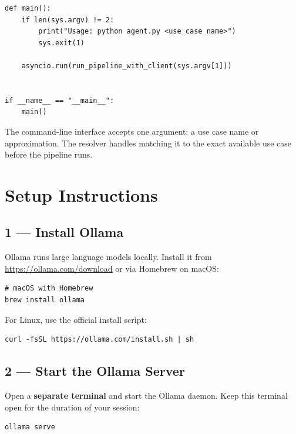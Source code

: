 \documentclass[12pt, a4paper]{article}
\begin{document}
\begin{lstlisting}[style=pythonstyle]
def main():
    if len(sys.argv) != 2:
        print("Usage: python agent.py <use_case_name>")
        sys.exit(1)

    asyncio.run(run_pipeline_with_client(sys.argv[1]))


if __name__ == "__main__":
    main()
\end{lstlisting}

The command-line interface accepts one argument: a use case name or approximation. The resolver handles matching it to the exact available use case before the pipeline runs.


\clearpage
\section{Setup Instructions}
\label{appendix:quickstart}
\subsection{1 --- Install Ollama}

Ollama runs large language models locally. Install it from \url{https://ollama.com/download} or via Homebrew on macOS:

\begin{lstlisting}[style=shellstyle]
# macOS with Homebrew
brew install ollama
\end{lstlisting}

For Linux, use the official install script:

\begin{lstlisting}[style=shellstyle]
curl -fsSL https://ollama.com/install.sh | sh
\end{lstlisting}

\subsection{2 --- Start the Ollama Server}

Open a \textbf{separate terminal} and start the Ollama daemon. Keep this terminal open for the duration of your session:

\begin{lstlisting}[style=shellstyle]
ollama serve
\end{lstlisting}
\end{document}
